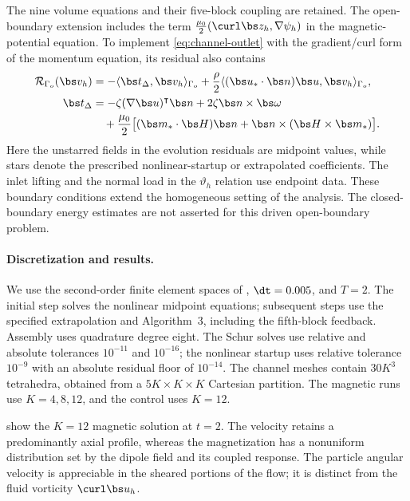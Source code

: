 The nine volume equations and their five-block coupling are retained.
The open-boundary extension includes the term
$\frac{\mu_0}{2}(\curl\bs z_h,\nabla\psi_h)$ in the
magnetic-potential equation. To implement \eqref{eq:channel-outlet}
with the gradient/curl form of the momentum equation, its residual
also contains
\begin{equation}\label{eq:channel-outlet-residual}
\begin{aligned}
 \mathcal R_{\Gamma_o}(\bs v_h)
 &=-\langle\bs t_\Delta,\bs v_h\rangle_{\Gamma_o}
 +\frac{\rho}{2}\langle(\bs u_*\cdot\bs n)\bs u,\bs v_h\rangle_{\Gamma_o},\\
 \bs t_\Delta
 &=-\zeta(\nabla\bs u)^{\intercal}\bs n+2\zeta\bs n\times\bs\omega\\
 &\quad+\frac{\mu_0}{2}\bigl[(\bs m_*\cdot\bs H)\bs n
       +\bs n\times(\bs H\times\bs m_*)\bigr].
\end{aligned}
\end{equation}
Here the unstarred fields in the evolution residuals are midpoint
values, while stars denote the prescribed nonlinear-startup or
extrapolated coefficients. The inlet lifting and the normal load in
the $\vartheta_h$ relation use endpoint data.
These boundary conditions extend the homogeneous setting of the
analysis. The closed-boundary energy estimates are not asserted for
this driven open-boundary problem.

\paragraph{Discretization and results.}
We use the second-order finite element spaces of
, $\dt=0.005$, and $T=2$.
The initial step solves the nonlinear midpoint equations; subsequent
steps use the specified extrapolation and Algorithm~3, including
the fifth-block feedback. Assembly uses quadrature degree eight.
The Schur solves use relative and absolute tolerances $10^{-11}$
and $10^{-16}$; the nonlinear startup uses relative tolerance
$10^{-9}$ with an absolute residual floor of $10^{-14}$.
The channel meshes contain $30K^3$ tetrahedra, obtained from a
$5K\times K\times K$ Cartesian partition.
The magnetic runs use $K=4,8,12$, and the control uses $K=12$.

 show the
$K=12$ magnetic solution at $t=2$.
The velocity retains a predominantly axial profile, whereas the
magnetization has a nonuniform distribution set by the dipole field
and its coupled response. The particle angular velocity is appreciable
in the sheared portions of the flow; it is distinct from the fluid
vorticity $\curl\bs u_h$.

